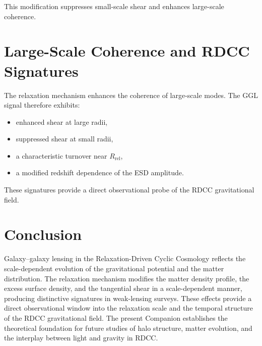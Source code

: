\documentclass[11pt,a4paper]{article}
\begin{document}
This modification suppresses small-scale shear and enhances large-scale coherence.
\section{Large-Scale Coherence and RDCC Signatures}

The relaxation mechanism enhances the coherence of large-scale modes. The GGL 
signal therefore exhibits:

\begin{itemize}
    \item enhanced shear at large radii,
    \item suppressed shear at small radii,
    \item a characteristic turnover near $R_{\mathrm{rel}}$,
    \item a modified redshift dependence of the ESD amplitude.
\end{itemize}

These signatures provide a direct observational probe of the RDCC gravitational 
field.
\section{Conclusion}

Galaxy--galaxy lensing in the Relaxation-Driven Cyclic Cosmology reflects the 
scale-dependent evolution of the gravitational potential and the matter 
distribution. The relaxation mechanism modifies the matter density profile, the 
excess surface density, and the tangential shear in a scale-dependent manner, 
producing distinctive signatures in weak-lensing surveys. These effects provide a 
direct observational window into the relaxation scale and the temporal structure of 
the RDCC gravitational field. The present Companion establishes the theoretical 
foundation for future studies of halo structure, matter evolution, and the 
interplay between light and gravity in RDCC.


\nocite{*}

\end{document}
